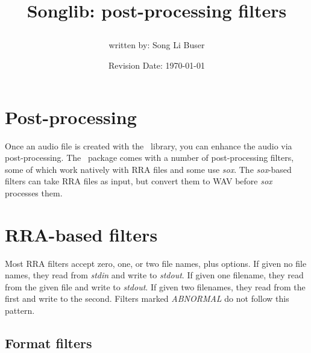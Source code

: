\documentclass{article}
\title{Songlib: post-processing filters\\
\date{Revision Date: \today}}
\author{written by: Song Li Buser}
\begin{document}
\maketitle

\W\subsubsection*{}
\W\htmlrule

\section*{Post-processing}

Once an audio file is created with the \songlib\ library, you can enhance
the audio via post-processing. The \songlib\ package comes with a number of
post-processing filters, some of which work natively with RRA files and
some use {\it sox}.
The {\it sox}-based filters can take RRA files as input, but convert
them to WAV before {\it sox} processes them.

\section*{RRA-based filters}

Most RRA filters accept zero, one, or two file names, plus options. If
given no file names, they read from {\it stdin} and write to {\it stdout}. If
given one filename, they read from the given file and write to {\it stdout}.
If given two filenames, they read from the first and write to the second.
Filters marked {\it ABNORMAL} do not follow this pattern.

\subsection*{Format filters}
\end{document}
